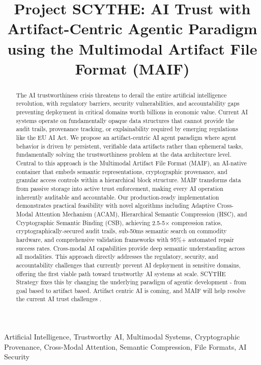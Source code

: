 \documentclass[conference]{IEEEtran}
\title{Project SCYTHE: AI Trust with Artifact-Centric Agentic Paradigm using the Multimodal Artifact File Format (MAIF)}
\author{
\IEEEauthorblockN{Cool Peeps Gang}
\IEEEauthorblockA{
Affiliation\\
Email: coolpeeps@owasp.org \& coolpeeps@industry.org}
}
\begin{document}
\maketitle

\begin{abstract}
The AI trustworthiness crisis threatens to derail the entire artificial intelligence revolution, with regulatory barriers, security vulnerabilities, and accountability gaps preventing deployment in critical domains worth billions in economic value. Current AI systems operate on fundamentally opaque data structures that cannot provide the audit trails, provenance tracking, or explainability required by emerging regulations like the EU AI Act. We propose an artifact-centric AI agent paradigm where agent behavior is driven by persistent, verifiable data artifacts rather than ephemeral tasks, fundamentally solving the trustworthiness problem at the data architecture level. Central to this approach is the Multimodal Artifact File Format (MAIF), an AI-native container that embeds semantic representations, cryptographic provenance, and granular access controls within a hierarchical block structure. MAIF transforms data from passive storage into active trust enforcement, making every AI operation inherently auditable and accountable. Our production-ready implementation demonstrates practical feasibility with novel algorithms including Adaptive Cross-Modal Attention Mechanism (ACAM), Hierarchical Semantic Compression (HSC), and Cryptographic Semantic Binding (CSB), achieving 2.5-5× compression ratios, cryptographically-secured audit trails, sub-50ms semantic search on commodity hardware, and comprehensive validation frameworks with 95\%+ automated repair success rates. Cross-modal AI capabilities provide deep semantic understanding across all modalities. This approach directly addresses the regulatory, security, and accountability challenges that currently prevent AI deployment in sensitive domains, offering the first viable path toward trustworthy AI systems at scale. SCYTHE Strategy fixes this by changing the underlying paradigm of agentic development - from goal based to artifact based. 
Artifact centric AI is coming, and MAIF will help resolve the current AI trust challenges \cite{googlemaspaper}. 
\end{abstract}

\begin{IEEEkeywords}
Artificial Intelligence, Trustworthy AI, Multimodal Systems, Cryptographic Provenance, Cross-Modal Attention, Semantic Compression, File Formats, AI Security
\end{IEEEkeywords}
\end{document}
